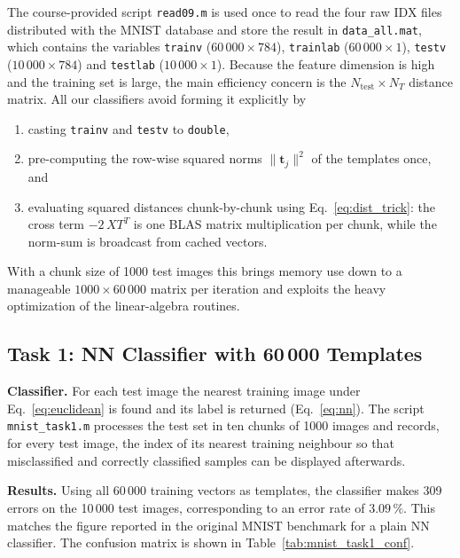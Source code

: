 \documentclass[11pt,a4paper]{article}
\begin{document}
The course-provided script \texttt{read09.m} is used once to read the four raw IDX files distributed with the MNIST database and store the result in \texttt{data\_all.mat}, which contains the variables \texttt{trainv} ($60\,000 \times 784$), \texttt{trainlab} ($60\,000 \times 1$), \texttt{testv} ($10\,000 \times 784$) and \texttt{testlab} ($10\,000 \times 1$). Because the feature dimension is high and the training set is large, the main efficiency concern is the $N_\text{test}\times N_T$ distance matrix. All our classifiers avoid forming it explicitly by
\begin{enumerate}
    \item casting \texttt{trainv} and \texttt{testv} to \texttt{double},
    \item pre-computing the row-wise squared norms $\|\mathbf{t}_j\|^2$ of the templates once, and
    \item evaluating squared distances chunk-by-chunk using Eq.~\eqref{eq:dist_trick}:
    the cross term $-2\,X T^T$ is one BLAS matrix multiplication per chunk, while the norm-sum is broadcast from cached vectors.
\end{enumerate}
With a chunk size of 1000 test images this brings memory use down to a manageable $1000\times60\,000$ matrix per iteration and exploits the heavy optimization of the linear-algebra routines.

\subsection{Task 1: NN Classifier with 60\,000 Templates}

\textbf{Classifier.} For each test image the nearest training image under Eq.~\eqref{eq:euclidean} is found and its label is returned (Eq.~\eqref{eq:nn}). The script \texttt{mnist\_task1.m} processes the test set in ten chunks of 1000 images and records, for every test image, the index of its nearest training neighbour so that misclassified and correctly classified samples can be displayed afterwards.

\textbf{Results.} Using all 60\,000 training vectors as templates, the classifier makes 309 errors on the 10\,000 test images, corresponding to an error rate of $3.09\,\%$. This matches the figure reported in the original MNIST benchmark for a plain NN classifier. The confusion matrix is shown in Table~\ref{tab:mnist_task1_conf}.
\end{document}
